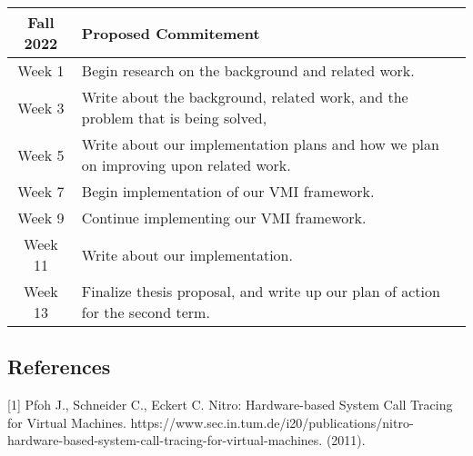 \documentclass{article}
\begin{document}
\begin{flushleft}
\begin{spacing}{1.5}
\begin{tabular}{ |c|l| }
 \hline
 {\textbf{Fall 2022}} & \textbf{Proposed Commitement} \\ 
 \hline
 Week 1 & Begin research on the background and related work. \\  
 \hline
 Week 3 & Write about the background, related work, and the problem that is being solved, \\  
 \hline
 Week 5 & Write about our implementation plans and how we plan on improving upon related work. \\ 
 \hline
 Week 7 & Begin implementation of our VMI framework. \\ 
 \hline
 Week 9 & Continue implementing our VMI framework.  \\ 
 \hline
 Week 11 & Write about our implementation. \\ 
 \hline
 Week 13 & Finalize thesis proposal, and write up our plan of action for the second term. \\ 
 \hline
\end{tabular}

\subsection*{\huge References}

{\large [1] Pfoh J., Schneider C., Eckert C. Nitro: Hardware-based System Call Tracing for
Virtual Machines.
https://www.sec.in.tum.de/i20/publications/nitro-hardware-based-system-call-tracing-for-virtual-machines. (2011).}

\end{spacing}
\end{flushleft}
\end{document}
